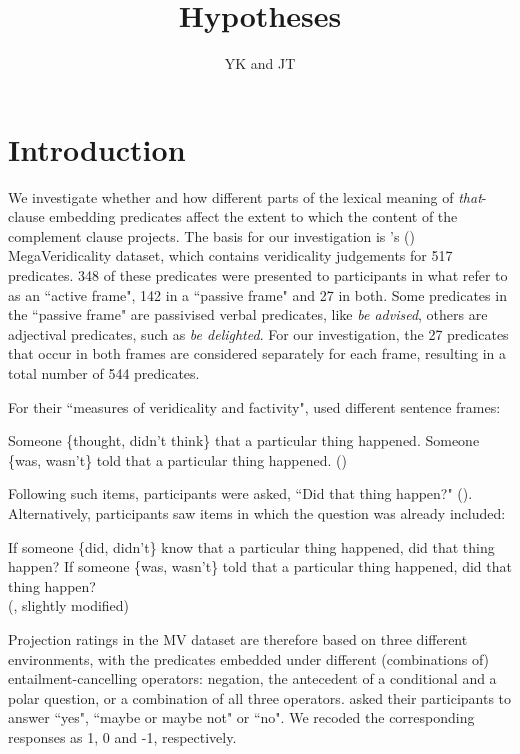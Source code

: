 \documentclass[11pt,fleqn]{article}
\title{Hypotheses}
\author{YK and JT}
\newcommand{\6}{\mbox{$[\hspace*{-.6mm}[$}}
\newcommand{\9}{\mbox{$]\hspace*{-.6mm}]$}}
\newcommand{\citepos}[1]{\citeauthor{#1}'s (\citeyear{#1})}
\begin{document}
\maketitle

\section{Introduction}
We investigate whether and how different parts of the lexical meaning of \emph{that}-clause embedding predicates affect the extent to which the content of the complement clause projects. The basis for our investigation is \citepos{white-rawlins-nels2018} MegaVeridicality dataset, which contains veridicality judgements for 517 predicates. 348 of these predicates were presented to participants in what \cite{white-rawlins-nels2018} refer to as an ``active frame", 142 in  a ``passive frame" and 27 in both. Some predicates in the ``passive frame" are passivised verbal predicates, like \emph{be advised}, others are adjectival predicates, such as \emph{be delighted}. For our investigation, the 27 predicates that occur in both frames are considered separately for each frame, resulting in a total number of 544 predicates.

For their ``measures of veridicality and factivity", \cite{white-rawlins-nels2018} used different sentence frames:
\begin{exe}		
	\ex 
	\begin{xlist}
		\ex Someone \{thought, didn’t think\} that a particular thing happened.
		\ex Someone \{was, wasn’t\} told that a particular thing happened. \hfill(\citealt{white-rawlins-nels2018})
	\end{xlist}
\end{exe}
Following such items, participants were asked, ``Did that thing happen?" (\citealt{white-rawlins-nels2018}). Alternatively, participants saw items in which the question was already included:
\begin{exe}		
	\ex 
	\begin{xlist}
		\ex If someone \{did, didn’t\} know that a particular thing happened, did that thing happen?
		\ex If someone \{was, wasn’t\} told that a particular thing happened, did that thing happen? \\ \null\hfill(\citealt{white-rawlins-nels2018}, slightly modified)
	\end{xlist}
\end{exe}
Projection ratings in the MV dataset are therefore based on three different environments, with the predicates embedded under different (combinations of) entailment-cancelling operators: negation, the antecedent of a conditional and a polar question, or a combination of all three operators. \cite{white-rawlins-nels2018} asked their participants to answer ``yes", ``maybe or maybe not" or ``no". We recoded the corresponding responses as 1, 0 and -1, respectively. 
\end{document}
